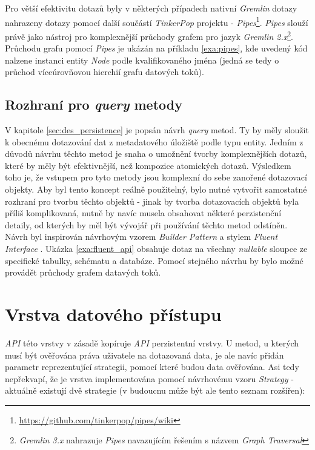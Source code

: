 Pro větší efektivitu dotazů byly v některých případech nativní \textit{Gremlin} dotazy nahrazeny dotazy pomocí další součástí \textit{TinkerPop} projektu - \textit{Pipes}\footnote{\url{https://github.com/tinkerpop/pipes/wiki}}. \textit{Pipes} slouží právě jako nástroj pro komplexnější průchody grafem pro jazyk \textit{Gremlin 2.x}\footnote{\textit{Gremlin 3.x} nahrazuje \textit{Pipes} navazujícím řešením s názvem \textit{Graph Traversal}}. Průchodu grafu pomocí \textit{Pipes} je ukázán na příkladu \ref{exa:pipes}, kde uvedený kód nalzene instanci entity \textit{Node} podle kvalifikovaného jména (jedná se tedy o průchod víceúrovňovou hierchií grafu datových toků).



\subsection{Rozhraní pro \textit{query} metody}
V kapitole \ref{sec:des_persistence} je popsán návrh \textit{query} metod. Ty by měly sloužit k obecnému dotazování dat z metadatového úložiště podle typu entity. Jedním z důvodů návrhu těchto metod je snaha o umožnění tvorby komplexnějších dotazů, které by měly být efektivnější, než kompozice atomických dotazů. Výsledkem toho je, že vstupem pro tyto metody jsou komplexní do sebe zanořené dotazovací objekty. Aby byl tento koncept reálně použitelný, bylo nutné vytvořit samostatné rozhraní pro tvorbu těchto objektů - jinak by tvorba dotazovacích objektů byla příliš komplikovaná, nutně by navíc musela obsahovat některé perzistenční detaily, od kterých by měl být vývojář při používání těchto metod odstíněn.
Návrh byl inspirován návrhovým vzorem \textit{Builder Pattern} a stylem \textit{Fluent Interface} \cite{Fowler05}. Ukázka \ref{exa:fluent_api} obsahuje dotaz na všechny \textit{nullable} sloupce ze specifické tabulky, schématu a databáze. Pomocí stejného návrhu by bylo možné provádět průchody grafem datavých toků.



\section{Vrstva datového přístupu}
\textit{API} této vrstvy v zásadě kopíruje \textit{API} perzistentní vrstvy.  U metod, u kterých musí být ověřována práva uživatele na dotazovaná data, je ale navíc přidán parametr reprezentující strategii, pomocí které budou data ověřována. Asi tedy nepřekvapí, že je vrstva implementována pomocí návrhovému vzoru \textit{Strategy} - aktuálně existují dvě strategie (v budoucnu může být ale tento seznam rozšířen):

